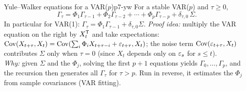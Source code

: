 \begin{theorem}{Yule--Walker equations for a VAR($p$)}{p7-yw}
For a stable VAR($p$) and $\tau\ge0$,
\[
\Gamma_\tau=\Phi_1\Gamma_{\tau-1}+\Phi_2\Gamma_{\tau-2}
+\cdots+\Phi_p\Gamma_{\tau-p}+\delta_{\tau,0}\,\Sigma .
\]
In particular for VAR(1): $\Gamma_\tau=\Phi_1\Gamma_{\tau-1}+\delta_{\tau,0}\Sigma$.
\textit{Proof idea:} multiply the VAR equation on the right by $X_t^{\mathsf{T}}$ and take
expectations: $\operatorname{Cov}(X_{t+\tau},X_t)=\operatorname{Cov}(\sum_i\Phi_i X_{t+\tau-i}+\varepsilon_{t+\tau},X_t)$;
the noise term $\operatorname{Cov}(\varepsilon_{t+\tau},X_t)$ contributes $\Sigma$ only when
$\tau=0$ (since $X_t$ depends only on $\varepsilon_s$ for $s\le t$).\\
\textit{Why:} given $\Sigma$ and the $\Phi_j$, solving the first $p+1$ equations
yields $\Gamma_0,\dots,\Gamma_p$, and the recursion then generates all
$\Gamma_\tau$ for $\tau>p$. Run in reverse, it estimates the $\Phi_j$ from sample
covariances (VAR fitting).
\end{theorem}

